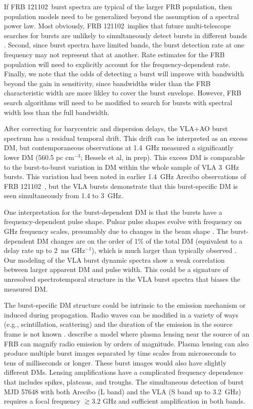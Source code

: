 \documentclass[twocolumn]{aastex61}
\newcommand{\frb}{FRB 121102}
\begin{document}
If \frb\ burst spectra are typical of the larger FRB population, then population models need to be generalized beyond the assumption of a spectral power law. Most obviously, \frb\ implies that future multi-telescope searches for bursts are unlikely to simultaneously detect bursts in different bands \citep[c.f.][]{1999ApJ...517..460S}. Second, since burst spectra have limited bands, the burst detection rate at one frequency may not represent that at another. Rate estimates for the FRB population will need to explicitly account for the frequency-dependent rate. Finally, we note that the odds of detecting a burst will improve with bandwidth beyond the gain in sensitivity, since bandwidths wider than the FRB characteristic width are more likley to cover the burst envelope. However, FRB search algorithms will need to be modified to search for bursts with spectral width less than the full bandwidth.

After correcting for barycentric and dispersion delays, the VLA+AO burst spectrum has a residual temporal drift. This drift can be interpreted as an excess DM, but contemporaneous observations at 1.4~GHz measured a significantly lower DM (560.5 pc cm$^{-3}$; Hessels et al, in prep). This excess DM is comparable to the burst-to-burst variation in DM within the whole sample of VLA 3~GHz bursts. This variation had been noted in earlier 1.4~GHz Arecibo observations of \frb\ \citep{2016Natur.531..202S,2016arXiv160308880S}, but the VLA bursts demonstrate that this burst-specific DM is seen simultaneously from 1.4 to 3~GHz.

One interpretation for the burst-dependent DM is that the bursts have a frequency-dependent pulse shape. Pulsar pulse shapes evolve with frequency on GHz frequency scales, presumably due to changes in the beam shape \citep{1988MNRAS.234..477L}. The burst-dependent DM changes are on the order of 1\% of the total DM (equivalent to a delay rate up to 2~ms GHz$^{-1}$), which is much larger than typically observed \citep{2017MNRAS.466.3706L}. Our modeling of the VLA burst dynamic spectra show a weak correlation between larger apparent DM and pulse width. This could be a signature of unresolved spectrotemporal structure in the VLA burst spectra that biases the measured DM.

The burst-specific DM structure could be intrinsic to the emission mechanism or induced during propagation. Radio waves can be modified in a variety of ways (e.g., scintillation, scattering) and the duration of the emission in the source frame is not known \citep{2016arXiv160505890C}. \citet{2017arXiv170306580C} describe a model where plasma lensing near the source of an FRB can magnify radio emission by orders of magnitude. Plasma lensing can also produce multiple burst images separated by time scales from microseconds to tens of milliseconds or longer. These burst images would also have slightly different DMs. Lensing amplifications have a complicated frequency dependence that includes spikes, plateaus, and troughs. The simultaneous detection of burst MJD 57648 with both Arecibo (L band) and the VLA (S band up to 3.2~GHz) requires a focal frequency $\gtrsim 3.2$ GHz and sufficient amplification in both bands.   
\end{document}
